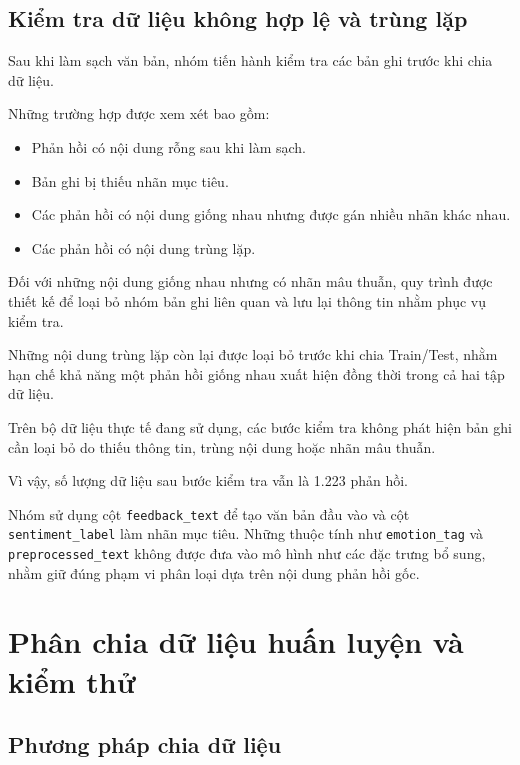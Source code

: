 \subsection{Kiểm tra dữ liệu không hợp lệ và trùng lặp}

Sau khi làm sạch văn bản, nhóm tiến hành kiểm tra các bản ghi trước khi chia dữ liệu.

Những trường hợp được xem xét bao gồm:

\begin{itemize}
    \item Phản hồi có nội dung rỗng sau khi làm sạch.

    \item Bản ghi bị thiếu nhãn mục tiêu.

    \item Các phản hồi có nội dung giống nhau nhưng được gán nhiều nhãn khác nhau.

    \item Các phản hồi có nội dung trùng lặp.
\end{itemize}

Đối với những nội dung giống nhau nhưng có nhãn mâu thuẫn, quy trình được thiết kế để loại bỏ nhóm bản ghi liên quan và lưu lại thông tin nhằm phục vụ kiểm tra.

Những nội dung trùng lặp còn lại được loại bỏ trước khi chia Train/Test, nhằm hạn chế khả năng một phản hồi giống nhau xuất hiện đồng thời trong cả hai tập dữ liệu.

Trên bộ dữ liệu thực tế đang sử dụng, các bước kiểm tra không phát hiện bản ghi cần loại bỏ do thiếu thông tin, trùng nội dung hoặc nhãn mâu thuẫn.

Vì vậy, số lượng dữ liệu sau bước kiểm tra vẫn là 1.223 phản hồi.

Nhóm sử dụng cột \texttt{feedback\_text} để tạo văn bản đầu vào và cột \texttt{sentiment\_label} làm nhãn mục tiêu. Những thuộc tính như \texttt{emotion\_tag} và \texttt{preprocessed\_text} không được đưa vào mô hình như các đặc trưng bổ sung, nhằm giữ đúng phạm vi phân loại dựa trên nội dung phản hồi gốc.



\section{Phân chia dữ liệu huấn luyện và kiểm thử}

\subsection{Phương pháp chia dữ liệu}

